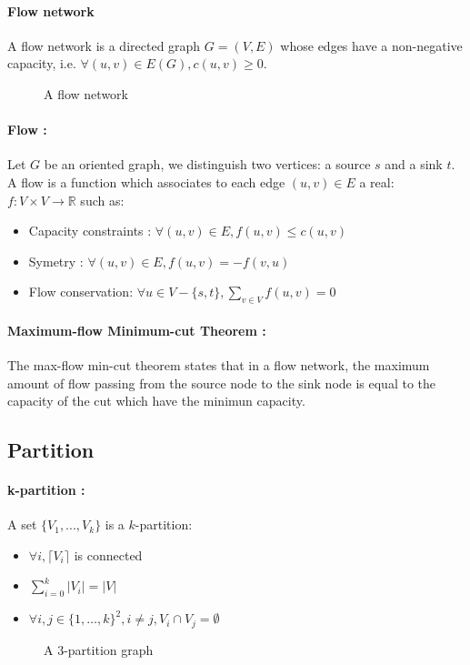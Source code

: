 \paragraph{Flow network}
A flow network is a directed graph $G=(V,E)$ whose edges have a non-negative
capacity, i.e. $\forall (u,v) \in E(G), c(u,v) \geq 0$.

\begin{figure}[!h]
  \begin{center}
    
  \end{center}
  \caption{A flow network}
\end{figure}

\paragraph{Flow :}
Let $G$ be an oriented graph, we distinguish two vertices: a source $s$ and a
sink $t$.
A flow is a function which associates to each edge $(u,v) \in E$ a real:
$f: V \times V \rightarrow \mathbb{R}$ such as:
\begin{itemize}
    \item Capacity constraints : $\forall (u,v) \in E, f(u,v) \leq c(u,v)$
    \item Symetry : $\forall (u,v) \in E, f(u,v) = - f(v,u) $
    \item Flow conservation: $\forall u \in V - \{s,t\}, \sum_{v \in V}f(u,v) = 0$ 
\end{itemize}


\paragraph{Maximum-flow Minimum-cut Theorem :}
The max-flow min-cut theorem states that in a flow network, the maximum amount
of flow passing from the source node to the sink node is equal to the capacity
of the cut which have the minimun capacity.

\subsection{Partition}
\paragraph{k-partition :}
A set $\{V_1,...,V_k\}$ is a $k$-partition:
\begin{itemize}
    \item $\forall i, \lceil V_i \rceil$ is connected
    \item $\sum\limits_{i=0}^k|V_i| = |V|$
    \item $\forall i,j \in \{1, \dots, k\}^2, i \neq j, V_i \cap V_j = \emptyset$
\end{itemize}

\begin{figure}[!h]
    \begin{center}
        
    \end{center}
    \caption{A 3-partition graph}
\end{figure}

